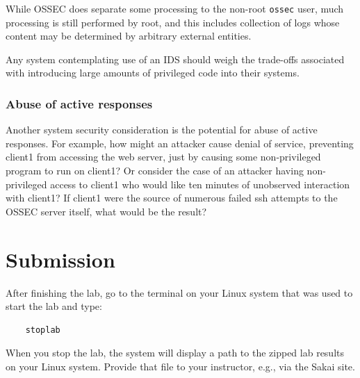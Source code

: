 While OSSEC does separate some processing to the non-root {\tt ossec} user, much processing is still performed by root,
and this includes collection of logs whose content may be determined by arbitrary external entities.

Any system contemplating use of an IDS should weigh the trade-offs associated with introducing large amounts of
privileged code into their systems.   

\subsubsection{Abuse of active responses}
Another system security consideration is the potential for abuse of active responses.  For example, how might an attacker
cause denial of service, preventing client1 from accessing the web server, just by causing some non-privileged program to
run on client1?  Or consider the case of an attacker having non-privileged access to client1 who would like ten minutes
of unobserved interaction with client1?  If client1 were the source of numerous failed ssh attempts to the OSSEC server itself,
what would be the result?

\section{Submission}
After finishing the lab, go to the terminal on your Linux system that was used to start the lab and type:
\begin{verbatim}
    stoplab 
\end{verbatim}
When you stop the lab, the system will display a path to the zipped lab results on your Linux system.  Provide that file to 
your instructor, e.g., via the Sakai site.

\copyrightnotice



